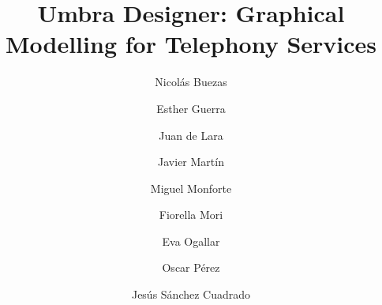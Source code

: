 
  \title{Umbra Designer: Graphical Modelling for Telephony Services}

  \author{Nicol\'as Buezas \and Esther Guerra \and Juan de Lara \and Javier Mart\'in \and Miguel Monforte \and Fiorella Mori \and Eva Ogallar \and Oscar P\'erez \and Jes\'us S\'anchez Cuadrado}

  
\maketitle
\clearpage
\setcounter{page}{189}